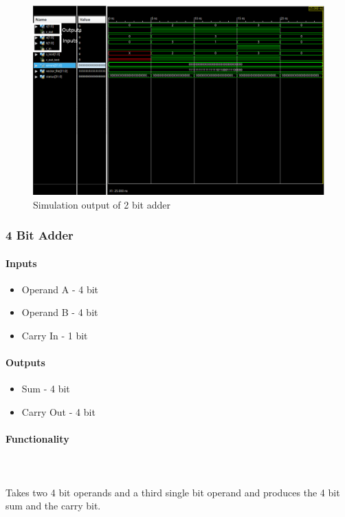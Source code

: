\documentclass{article}
\begin{document}
    \begin{figure}[H]
        \centering
        \includegraphics[width=0.9\paperwidth,center]{Screenshots/adder_2.png}
        \caption{Simulation output of 2 bit adder}
    \end{figure}




    \subsubsection{4 Bit Adder}

    \paragraph{Inputs}
    \begin{itemize}
        \item Operand A - 4 bit
        \item Operand B - 4 bit
        \item Carry In - 1 bit
    \end{itemize}

    \paragraph{Outputs}
    \begin{itemize}
        \item Sum - 4 bit
        \item Carry Out - 4 bit
    \end{itemize}

    \paragraph{Functionality}
    \hfill\\\\
    Takes two 4 bit operands and a third single bit operand and produces the
    4 bit sum and the carry bit.
\end{document}
